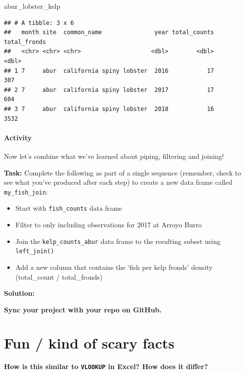 \documentclass[]{book}
\newenvironment{Shaded}{\begin{snugshade}}{\end{snugshade}}
\newcommand{\NormalTok}[1]{#1}
\providecommand{\tightlist}{%
  \setlength{\itemsep}{0pt}\setlength{\parskip}{0pt}}
\let\oldparagraph\paragraph
\renewcommand{\paragraph}[1]{\oldparagraph{#1}\mbox{}}
\begin{document}
\begin{Shaded}
\begin{Highlighting}[]
\NormalTok{abur_lobster_kelp}
\end{Highlighting}
\end{Shaded}

\begin{verbatim}
## # A tibble: 3 x 6
##   month site  common_name               year total_counts total_fronds
##   <chr> <chr> <chr>                    <dbl>        <dbl>        <dbl>
## 1 7     abur  california spiny lobster  2016           17          307
## 2 7     abur  california spiny lobster  2017           17          604
## 3 7     abur  california spiny lobster  2018           16         3532
\end{verbatim}

\hypertarget{activity-5}{%
\paragraph{Activity}\label{activity-5}}

Now let's combine what we've learned about piping, filtering and joining!

\textbf{Task:} Complete the following as part of a single sequence (remember, check to see what you've produced after each step) to create a new data frame called \texttt{my\_fish\_join}:

\begin{itemize}
\tightlist
\item
  Start with \texttt{fish\_counts} data frame
\item
  Filter to only including observations for 2017 at Arroyo Burro
\item
  Join the \texttt{kelp\_counts\_abur} data frame to the resulting subset using \texttt{left\_join()}
\item
  Add a new column that contains the `fish per kelp fronds' density (total\_count / total\_fronds)
\end{itemize}

\textbf{Solution:}

\textbf{Sync your project with your repo on GitHub.}

\hypertarget{fun-kind-of-scary-facts}{%
\section{Fun / kind of scary facts}\label{fun-kind-of-scary-facts}}

\textbf{How is this similar to \texttt{VLOOKUP} in Excel? How does it differ?}
\end{document}
